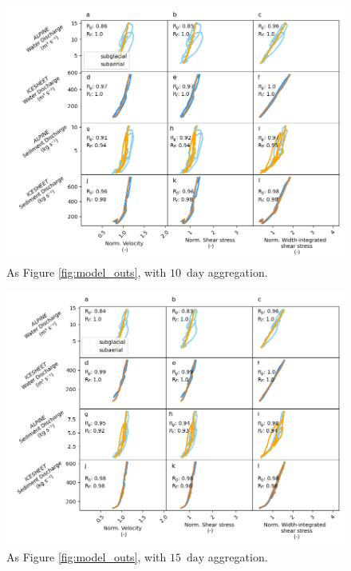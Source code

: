 \documentclass[draft]{agujournal2019}
\newcommand{\unit}[1]{$\mathrm{#1}$}
\begin{document}
\begin{center}
  \begin{figure}[h]
    \includegraphics[width=0.7\linewidth]{Fig3_10day.png}
    \caption{As Figure \ref{fig:model_outs}, with $10$ \,\unit{day} aggregation.}
    \label{fig:model_outs_10day}
  \end{figure}
\end{center}
\begin{center}
  \begin{figure}[h]
    \includegraphics[width=0.7\linewidth]{Fig3_15day.png}
    \caption{As Figure \ref{fig:model_outs}, with $15$ \,\unit{day} aggregation.}
    \label{fig:model_outs_15day}
  \end{figure}
\end{center}

\newpage
\end{document}
